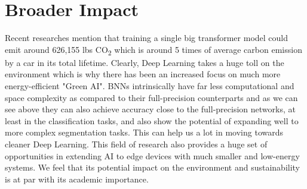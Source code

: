 \section*{Broader Impact}
Recent researches \citet{r3} mention that training a single big transformer model could emit around 626,155 lbs CO\textsubscript{2} which is around 5 times of average carbon emission by a car in its total lifetime. Clearly, Deep Learning takes a huge toll on the environment which is why there has been an increased focus on much more energy-efficient "Green AI". BNNs intrinsically have far less computational and space complexity as compared to their full-precision counterparts and as we can see above they can also achieve accuracy close to the full-precision networks, at least in the classification tasks, and also show the potential of expanding well to more complex segmentation tasks. This can help us a lot in moving towards cleaner Deep Learning. This field of research also provides a huge set of opportunities in extending AI to edge devices with much smaller and low-energy systems. We feel that its potential impact on the environment and sustainability is at par with its academic importance.